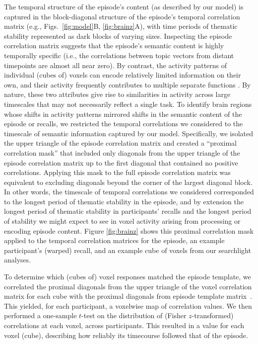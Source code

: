 \documentclass[10pt]{article}
\begin{document}
The temporal structure of the episode's content (as described by our model) is captured in the block-diagonal structure of the episode's temporal correlation matrix (e.g., Figs.~\ref{fig:model}B, \ref{fig:brainz}A), with time periods of thematic stability represented as dark blocks of varying sizes.  Inspecting the episode correlation matrix suggests that the episode's semantic content is highly temporally specific (i.e., the correlations between topic vectors from distant timepoints are almost all near zero).  By contrast, the activity patterns of individual (cubes of) voxels can encode relatively limited information on their own, and their activity frequently contributes to multiple separate functions \citep{FreeEtal01, SigmDeha08, CharKoec10, RishEtal13}.  By nature, these two attributes give rise to similarities in activity across large timescales that may not necessarily reflect a single task.  To identify brain regions whose shifts in activity patterns mirrored shifts in the semantic content of the episode or recalls, we restricted the temporal correlations we considered to the timescale of semantic information captured by our model.  Specifically, we isolated the upper triangle of the episode correlation matrix and created a ``proximal correlation mask'' that included only diagonals from the upper triangle of the episode correlation matrix up to the first diagonal that contained no positive correlations.  Applying this mask to the full episode correlation matrix was equivalent to excluding diagonals beyond the corner of the largest diagonal block.  In other words, the timescale of temporal correlations we considered corresponded to the longest period of thematic stability in the episode, and by extension the longest period of thematic stability in participants' recalls and the longest period of stability we might expect to see in voxel activity arising from processing or encoding episode content.  Figure \ref{fig:brainz} shows this proximal correlation mask applied to the temporal correlation matrices for the episode, an example participant's (warped) recall, and an example cube of voxels from our searchlight analyses.

To determine which (cubes of) voxel responses matched the episode template, we correlated the proximal diagonals from the upper triangle of the voxel correlation matrix for each cube with the proximal diagonals from episode template matrix~\citep{KrieEtal08b}.  This yielded, for each participant, a voxelwise map of correlation values.  We then performed a one-sample $t$-test on the distribution of (Fisher $z$-transformed) correlations at each voxel, across participants.  This resulted in a value for each voxel (cube), describing how reliably its timecourse followed that of the episode.
\end{document}
